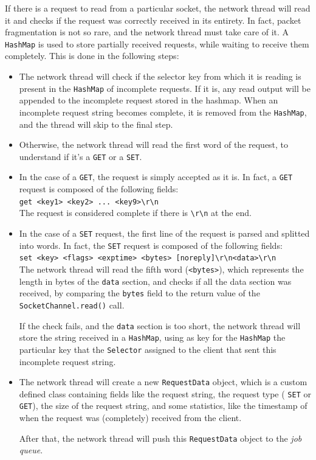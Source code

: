 \documentclass[11pt,a4paper]{article}
\renewcommand{\t}[1]{%
	{\texttt{#1}}}
\begin{document}
If there is a request to read from a particular socket, the network thread will read it and checks
if the request was correctly received in its entirety. In fact, packet fragmentation is not 
so rare, and the network thread must take care of it. A \t{HashMap} is used to store
partially received requests, while waiting to receive them completely. This is done in the following steps:
\begin{itemize}
	\item The network thread will check if the selector key from which it is reading is present in the \t{HashMap}
		of incomplete requests. If it is, any read output will be appended to the incomplete request
		stored in the hashmap. When an incomplete request string
		becomes complete, it is removed from the \t{HashMap}, and the thread will skip to the final step.

	\item Otherwise, the network thread will read the first word of the request, to understand if it's 
		a \t{GET} or a \t{SET}.
	\item In the case of a \t{GET}, the request is simply accepted as it is. In fact, a \t{GET} request is 
		composed of the following fields: \\
		\verb|get <key1> <key2> ... <key9>\r\n| \\
		The request is considered complete if there is \verb|\r\n| at the end.
	\item In the case of a \t{SET} request, the first line of the request is parsed and splitted into
		words. In fact, the \t{SET} request is composed of the following fields: \\
		\verb|set <key> <flags> <exptime> <bytes> [noreply]\r\n<data>\r\n| \\
		The network thread will read the fifth word (\verb|<bytes>|), which represents the length in bytes of the \t{data} section, 
		and checks if all the data section was received, by comparing the \t{bytes} field to the return value
		of the \t{SocketChannel.read()} call.

		If the check fails, and the \t{data} section is too short, the network thread will store the string received
		in a \t{HashMap}, using as key for the \t{HashMap} the particular key that the \t{Selector} assigned to the
		client that sent this incomplete request string. 
	\item The network thread will create a new \t{RequestData} object, which is a custom defined class containing
		fields like the request string, the request type (\t{SET} or \t{GET}), the size of the request string, 
		and some statistics, like the timestamp of when the request was (completely) received from the client.

		After that, the network thread will push this \t{RequestData} object to the \emph{job queue}.
\end{itemize}
\end{document}
